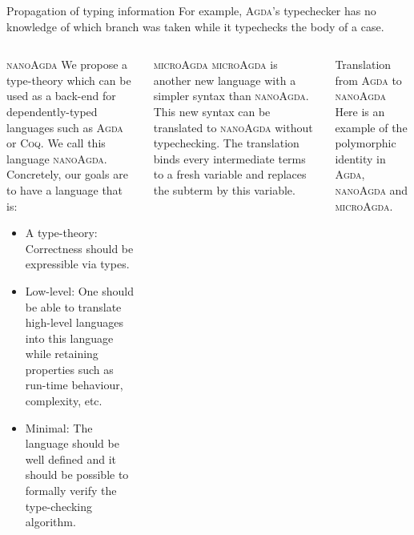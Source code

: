 \documentclass[final, xcolor=svgnames]{beamer}
\newcommand{\coq}{\textsc{Coq}\xspace}
\newcommand{\agda}{\textsc{Agda}\xspace}
\newcommand{\ma}{\textsc{microAgda}\xspace}
\newcommand{\na}{\textsc{nanoAgda}\xspace}
\begin{document}
\begin{frame}[shrink]
\begin{columns}[t]
\begin{block}{Propagation of typing information}
      For example, \agda's typechecker has no knowledge of which branch was taken while it typechecks the body of a case.
      \begin{center}
        \begin{minipage}{0.85\textwidth}
          
        \end{minipage}
     \end{center}
   \end{block}
 \end{columns}
 \vspace{6cm}
 \begin{columns}[t]
   \begin{block}{\na}
     We propose a type-theory which can be used as a back-end for dependently-typed languages such as \agda or \coq. We call this language \na. Concretely, our goals are to have a language that is:
     \begin{itemize}
     \item A type-theory: Correctness should be expressible via types.
     \item Low-level: One should be able to translate high-level languages into this language while retaining properties such as run-time behaviour, complexity, etc.
     \item Minimal: The language should be well defined and it should be possible to formally verify the type-checking algorithm.
     \end{itemize}
   \end{block}
   \begin{block}{\ma}
     \ma is another new language with a simpler syntax than \na. This new syntax can be translated to \na without typechecking. The translation binds every intermediate terms to a fresh variable and replaces the subterm by this variable.
     \vspace{25pt}
   \end{block}
   \begin{block}{Translation from \agda to \na}
     Here is an example of the polymorphic identity in \agda, \na and \ma.
     \begin{figure}
\end{figure}
\end{block}
\end{columns}
\end{frame}
\end{document}
